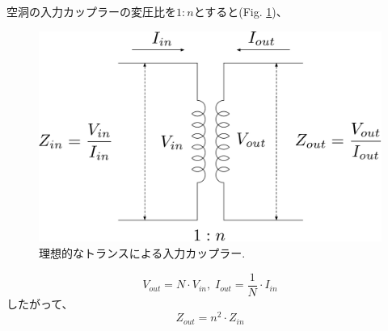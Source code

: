 \documentclass[book]{jlreq}
\begin{document}
空洞の入力カップラーの変圧比を$1:n$とすると(Fig. \ref{fig:Ideal_Trans})、
%
\begin{figure}[hbt]
    \begin{center}
        \includegraphics[width=\linewidth]{figs/Ideal_Transformer.pdf}
        \caption{理想的なトランスによる入力カップラー.}
        \label{fig:Ideal_Trans}
    \end{center}
\end{figure}
%
\begin{equation}
    V_{out} = N\cdot V_{in}, \; I_{out} = \frac{1}{N}\cdot I_{in}
\end{equation}
%
したがって、
\begin{equation}
    Z_{out} = n^2 \cdot Z_{in}
\end{equation}
\end{document}
